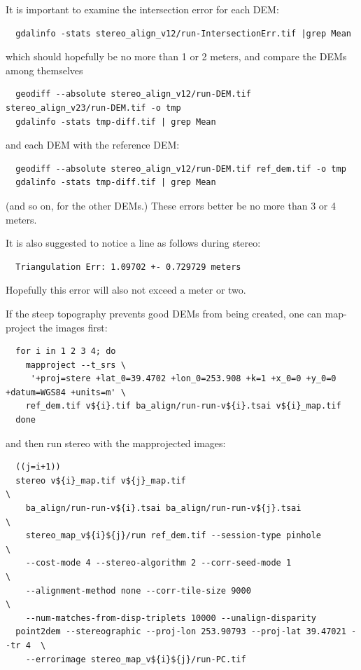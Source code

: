 It is important to examine the intersection error for each DEM:
\begin{verbatim}
  gdalinfo -stats stereo_align_v12/run-IntersectionErr.tif |grep Mean
\end{verbatim}

which should hopefully be no more than 1 or 2 meters, and compare the DEMs among themselves
\begin{verbatim}
  geodiff --absolute stereo_align_v12/run-DEM.tif stereo_align_v23/run-DEM.tif -o tmp 
  gdalinfo -stats tmp-diff.tif | grep Mean
\end{verbatim}

and each DEM with the reference DEM:
\begin{verbatim}
  geodiff --absolute stereo_align_v12/run-DEM.tif ref_dem.tif -o tmp 
  gdalinfo -stats tmp-diff.tif | grep Mean
\end{verbatim}

(and so on, for the other DEMs.) These errors better be no more than 3 or 4 meters.

It is also suggested to notice a line as follows during stereo:
\begin{verbatim}
  Triangulation Err: 1.09702 +- 0.729729 meters
\end{verbatim}

Hopefully this error will also not exceed a meter or two. 

If the steep topography prevents good DEMs from being created, one can 
map-project the images first:

\begin{verbatim}
  for i in 1 2 3 4; do 
    mapproject --t_srs \
     '+proj=stere +lat_0=39.4702 +lon_0=253.908 +k=1 +x_0=0 +y_0=0 +datum=WGS84 +units=m' \
    ref_dem.tif v${i}.tif ba_align/run-run-v${i}.tsai v${i}_map.tif  
  done
\end{verbatim} %

and then run stereo with the mapprojected images:

\begin{verbatim}
  ((j=i+1))
  stereo v${i}_map.tif v${j}_map.tif                                         \
    ba_align/run-run-v${i}.tsai ba_align/run-run-v${j}.tsai                  \
    stereo_map_v${i}${j}/run ref_dem.tif --session-type pinhole              \
    --cost-mode 4 --stereo-algorithm 2 --corr-seed-mode 1                    \
    --alignment-method none --corr-tile-size 9000                            \
    --num-matches-from-disp-triplets 10000 --unalign-disparity
  point2dem --stereographic --proj-lon 253.90793 --proj-lat 39.47021 --tr 4  \
    --errorimage stereo_map_v${i}${j}/run-PC.tif
\end{verbatim}

